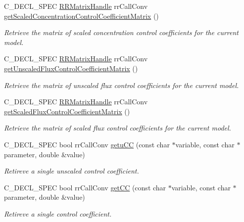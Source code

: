 \begin{DoxyCompactItemize}
\-C\-\_\-\-D\-E\-C\-L\-\_\-\-S\-P\-E\-C \hyperlink{rr__c__types_8h_a87174eefa58ae98dec58c9253ae6c5da}{\-R\-R\-Matrix\-Handle} \*
rr\-Call\-Conv \hyperlink{group__mca_gad28644ca7615c71725056028a0a048ba}{get\-Scaled\-Concentration\-Control\-Coefficient\-Matrix} ()
\begin{DoxyCompactList}\small\item\em \-Retrieve the matrix of scaled concentration control coefficients for the current model. \end{DoxyCompactList}\item 
\-C\-\_\-\-D\-E\-C\-L\-\_\-\-S\-P\-E\-C \hyperlink{rr__c__types_8h_a87174eefa58ae98dec58c9253ae6c5da}{\-R\-R\-Matrix\-Handle} \*
rr\-Call\-Conv \hyperlink{group__mca_ga4b464166bb67773916067bc7e190a338}{get\-Unscaled\-Flux\-Control\-Coefficient\-Matrix} ()
\begin{DoxyCompactList}\small\item\em \-Retrieve the matrix of unscaled flux control coefficients for the current model. \end{DoxyCompactList}\item 
\-C\-\_\-\-D\-E\-C\-L\-\_\-\-S\-P\-E\-C \hyperlink{rr__c__types_8h_a87174eefa58ae98dec58c9253ae6c5da}{\-R\-R\-Matrix\-Handle} \*
rr\-Call\-Conv \hyperlink{group__mca_gad63647a85b299d463b1e4cd5671d0881}{get\-Scaled\-Flux\-Control\-Coefficient\-Matrix} ()
\begin{DoxyCompactList}\small\item\em \-Retrieve the matrix of scaled flux control coefficients for the current model. \end{DoxyCompactList}\item 
\-C\-\_\-\-D\-E\-C\-L\-\_\-\-S\-P\-E\-C bool rr\-Call\-Conv \hyperlink{group__mca_ga6655b7aebdc9e6fad4e7a54e3de9195d}{getu\-C\-C} (const char $\ast$variable, const char $\ast$parameter, double \&value)
\begin{DoxyCompactList}\small\item\em \-Retireve a single unscaled control coefficient. \end{DoxyCompactList}\item 
\-C\-\_\-\-D\-E\-C\-L\-\_\-\-S\-P\-E\-C bool rr\-Call\-Conv \hyperlink{group__mca_ga49c703842a069c37fa472f2740dd514b}{get\-C\-C} (const char $\ast$variable, const char $\ast$parameter, double \&value)
\begin{DoxyCompactList}\small\item\em \-Retireve a single control coefficient. \end{DoxyCompactList}\item 

\end{DoxyCompactItemize}
